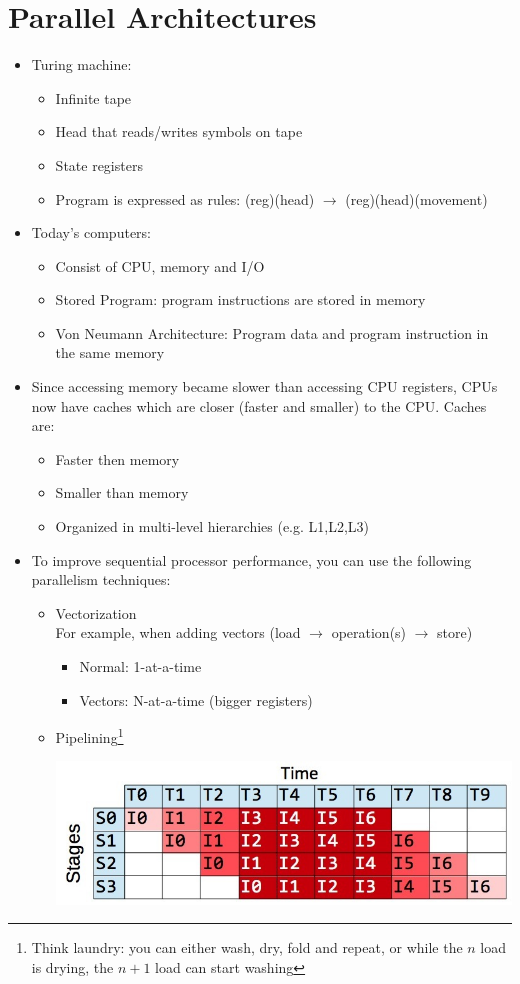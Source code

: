 \documentclass[a4paper]{article}
\begin{document}
\section{Parallel Architectures}
\begin{itemize}
\item Turing machine:
\begin{itemize}
\item Infinite tape
\item Head that reads/writes symbols on tape
\item State registers
\item Program is expressed as rules: (reg)(head) $\to$ (reg)(head)(movement)
\end{itemize}
\item Today's computers: 
\begin{itemize}
\item Consist of CPU, memory and I/O
\item Stored Program: program instructions are stored in memory
\item Von Neumann Architecture: Program data and program instruction in the same memory
\end{itemize}
\item Since accessing memory became slower than accessing CPU registers, CPUs now have caches which are closer (faster and smaller) to the CPU. Caches are:
\begin{itemize}
\item Faster then memory
\item Smaller than memory
\item Organized in multi-level hierarchies (e.g. L1,L2,L3)
\end{itemize}
\item To improve sequential processor performance, you can use the following parallelism techniques:
\begin{itemize}
\item Vectorization\\
For example, when adding vectors (load $\to$ operation(s) $\to$ store)
\begin{itemize}
\item Normal: 1-at-a-time
\item Vectors: N-at-a-time (bigger registers)
\end{itemize}
\item Pipelining\footnote{Think laundry: you can either wash, dry, fold and repeat, or while the $n$ load is drying, the $n+1$ load can start washing}
\begin{center}
\includegraphics[scale=0.4]{Figures/pipelineTimeStages.jpg}
\end{center}


\end{itemize}
\end{itemize}
\end{document}
